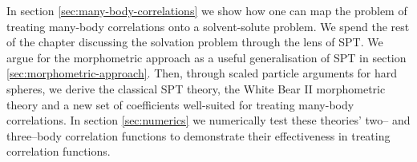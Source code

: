 \documentclass[11pt,twoside]{report}
\begin{document}




In section \ref{sec:many-body-correlations} we show how one can map the problem of treating many-body correlations onto a solvent-solute problem.
We spend the rest of the chapter discussing the solvation problem through the lens of SPT.
We argue for the morphometric approach as a useful generalisation of SPT in section \ref{sec:morphometric-approach}.
Then, through scaled particle arguments for hard spheres, we derive the classical SPT theory, the White Bear II morphometric theory \cite{Hansen-GoosJPCM2006} and a new set of coefficients well-suited for treating many-body correlations.
In section \ref{sec:numerics} we numerically test these theories' two-- and three--body correlation functions to demonstrate their effectiveness in treating correlation functions.
\end{document}
